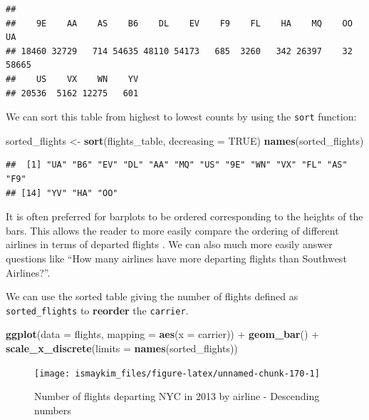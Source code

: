 \documentclass[]{tufte-book}
\newenvironment{Shaded}{\begin{snugshade}}{\end{snugshade}}
\newcommand{\KeywordTok}[1]{\textcolor[rgb]{0.13,0.29,0.53}{\textbf{{#1}}}}
\newcommand{\DataTypeTok}[1]{\textcolor[rgb]{0.13,0.29,0.53}{{#1}}}
\newcommand{\StringTok}[1]{\textcolor[rgb]{0.31,0.60,0.02}{{#1}}}
\newcommand{\OtherTok}[1]{\textcolor[rgb]{0.56,0.35,0.01}{{#1}}}
\newcommand{\NormalTok}[1]{{#1}}
\begin{document}
\begin{verbatim}
## 
##    9E    AA    AS    B6    DL    EV    F9    FL    HA    MQ    OO    UA 
## 18460 32729   714 54635 48110 54173   685  3260   342 26397    32 58665 
##    US    VX    WN    YV 
## 20536  5162 12275   601
\end{verbatim}

We can sort this table from highest to lowest counts by using the
\texttt{sort} function:

\begin{Shaded}
\begin{Highlighting}[]
\NormalTok{sorted_flights <-}\StringTok{ }\KeywordTok{sort}\NormalTok{(flights_table, }\DataTypeTok{decreasing =} \OtherTok{TRUE}\NormalTok{)}
\KeywordTok{names}\NormalTok{(sorted_flights)}
\end{Highlighting}
\end{Shaded}

\begin{verbatim}
##  [1] "UA" "B6" "EV" "DL" "AA" "MQ" "US" "9E" "WN" "VX" "FL" "AS" "F9"
## [14] "YV" "HA" "OO"
\end{verbatim}

It is often preferred for barplots to be ordered corresponding to the
heights of the bars. This allows the reader to more easily compare the
ordering of different airlines in terms of departed flights
\citep{robbins2013}. We can also much more easily answer questions like
``How many airlines have more departing flights than Southwest
Airlines?''.

We can use the sorted table giving the number of flights defined as
\texttt{sorted\_flights} to \textbf{reorder} the \texttt{carrier}.

\begin{Shaded}
\begin{Highlighting}[]
\KeywordTok{ggplot}\NormalTok{(}\DataTypeTok{data =} \NormalTok{flights, }\DataTypeTok{mapping =} \KeywordTok{aes}\NormalTok{(}\DataTypeTok{x =} \NormalTok{carrier)) +}
\StringTok{  }\KeywordTok{geom_bar}\NormalTok{() +}
\StringTok{  }\KeywordTok{scale_x_discrete}\NormalTok{(}\DataTypeTok{limits =} \KeywordTok{names}\NormalTok{(sorted_flights))}
\end{Highlighting}
\end{Shaded}

\begin{figure}

{\centering \texttt{[image: ismaykim\_files/figure-latex/unnamed-chunk-170-1]} 

}

\caption[Number of flights departing NYC in 2013 by airline - Descending numbers]{Number of flights departing NYC in 2013 by airline - Descending numbers}\label{fig:unnamed-chunk-170}
\end{figure}
\end{document}
